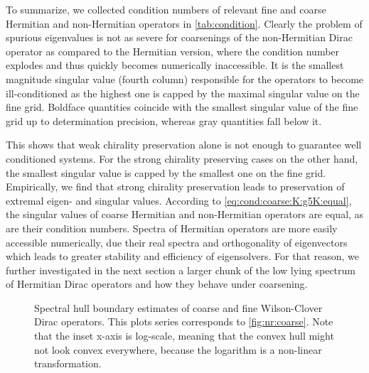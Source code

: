 To summarize, we collected condition numbers of relevant fine and coarse Hermitian and non-Hermitian operators in \cref{tab:condition}.
Clearly the problem of spurious eigenvalues is not as severe for coarsenings of the non-Hermitian Dirac operator as compared to the Hermitian version, where the condition number explodes and thus quickly becomes numerically inaccessible.
It is the smallest magnitude singular value (fourth column) responsible for the operators to become ill-conditioned as the highest one is capped by the maximal singular value on the fine grid.
Boldface quantities coincide with the smallest singular value of the fine grid up to determination precision, whereas gray quantities fall below it.

This shows that weak chirality preservation alone is not enough to guarantee well conditioned systems.
For the strong chirality preserving cases on the other hand, the smallest singular value is capped by the smallest one on the fine grid.
Empirically, we find that strong chirality preservation leads to preservation of extremal eigen- and singular values.
According to \cref{eq:cond:coarse:K:g5K:equal}, the singular values of coarse Hermitian and non-Hermitian operators are equal, as are their condition numbers.
Spectra of Hermitian operators are more easily accessible numerically, due their real spectra and orthogonality of eigenvectors which leads to greater stability and efficiency of eigensolvers.
For that reason, we further investigated in the next section a larger chunk of the low lying spectrum of Hermitian Dirac operators and how they behave under coarsening.

\begin{figure}
\centering

\hfill
{}

\hfill
{}

\caption{
Spectral hull boundary estimates of coarse and fine Wilson-Clover Dirac operators.
This plots series corresponds to \cref{fig:nr:coarse}.
Note that the inset x-axis is log-scale, meaning that the convex hull might not look convex everywhere, because the logarithm is a non-linear transformation.
}
\label{fig:ch:coarse}
\end{figure}

